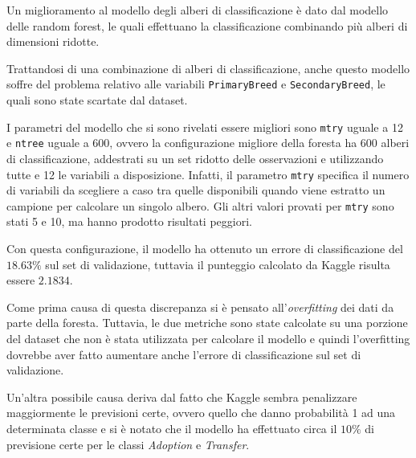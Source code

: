 Un miglioramento al modello degli alberi di classificazione è dato dal modello delle random forest, le quali effettuano la classificazione combinando più alberi di dimensioni ridotte.

Trattandosi di una combinazione di alberi di classificazione, anche questo modello soffre del problema relativo alle variabili \texttt{PrimaryBreed} e \texttt{SecondaryBreed}, le quali sono state scartate dal dataset.

I parametri del modello che si sono rivelati essere migliori sono \texttt{mtry} uguale a 12 e \texttt{ntree} uguale a 600, ovvero la configurazione migliore della foresta ha 600 alberi di classificazione, addestrati su un set ridotto delle osservazioni e utilizzando tutte e 12 le variabili a disposizione. Infatti, il parametro \texttt{mtry} specifica il numero di variabili da scegliere a caso tra quelle disponibili quando viene estratto un campione per calcolare un singolo albero.
Gli altri valori provati per \texttt{mtry} sono stati 5 e 10, ma hanno prodotto risultati peggiori.

Con questa configurazione, il modello ha ottenuto un errore di classificazione del $18.63\%$ sul set di validazione, tuttavia il punteggio calcolato da Kaggle risulta essere $2.1834$.

Come prima causa di questa discrepanza si è pensato all'\textit{overfitting} dei dati da parte della foresta. Tuttavia, le due metriche sono state calcolate su una porzione del dataset che non è stata utilizzata per calcolare il modello e quindi l'overfitting dovrebbe aver fatto aumentare anche l'errore di classificazione sul set di validazione.

Un'altra possibile causa deriva dal fatto che Kaggle sembra penalizzare maggiormente le previsioni certe, ovvero quello che danno probabilità 1 ad una determinata classe e si è notato che il modello ha effettuato circa il $10\%$ di previsione certe per le classi \textit{Adoption} e \textit{Transfer}.

